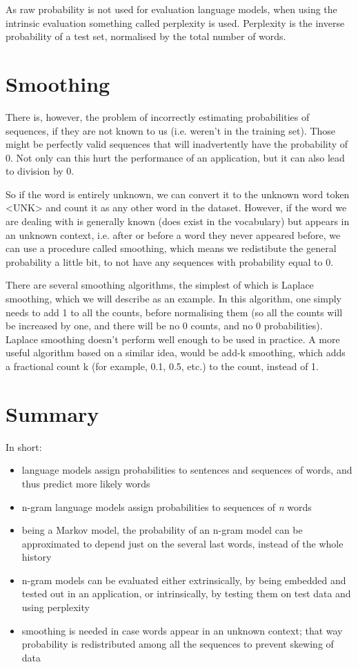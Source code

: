 As raw probability is not used for evaluation language models, when using the intrinsic evaluation something called perplexity is used. Perplexity is the inverse probability of a test set, normalised by the total number of words.

\section{Smoothing}
\label{sec:NgramBackground-Smoothing}
There is, however, the problem of incorrectly estimating probabilities of sequences, if they are not known to us (i.e. weren't in the training set). Those might be perfectly valid sequences that will inadvertently have the probability of 0. Not only can this hurt the performance of an application, but it can also lead to division by 0.

So if the word is entirely unknown, we can convert it to the unknown word token <UNK> and count it as any other word in the dataset. However, if the word we are dealing with is generally known (does exist in the vocabulary) but appears in an unknown context, i.e. after or before a word they never appeared before, we can use a procedure called smoothing, which means we redistibute the general probability a little bit, to not have any sequences with probability equal to 0.

There are several smoothing algorithms, the simplest of which is Laplace smoothing, which we will describe as an example. In this algorithm, one simply needs to add 1 to all the counts, before normalising them (so all the counts will be increased by one, and there will be no 0 counts, and no 0 probabilities). Laplace smoothing doesn't perform well enough to be used in practice. A more useful algorithm based on a similar idea, would be add-k smoothing, which adds a fractional count k (for example, 0.1, 0.5, etc.) to the count, instead of 1.

\section{Summary}
\label{sec:NgramBackground-Summary}
In short:
\begin{itemize}
    \item language models assign probabilities to sentences and sequences of words, and thus predict more likely words
    \item n-gram language models assign probabilities to sequences of \textit{n} words
    \item being a Markov model, the probability of an n-gram model can be approximated to depend just on the several last words, instead of the whole history
    \item n-gram models can be evaluated either extrinsically, by being embedded and tested out in an application, or intrinsically, by testing them on test data and using perplexity
    \item smoothing is needed in case words appear in an unknown context; that way probability is redistributed among all the sequences to prevent skewing of data
\end{itemize}